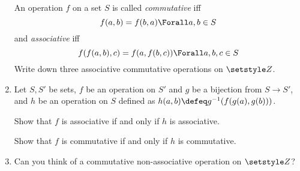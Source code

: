 \begin{enumerate}
  An operation \(f\) on a set \(S\) is called \emph{commutative} iff
  \begin{equation*}
   f(a, b) = f(b, a) \Forall a, b \in S
  \end{equation*}
  and \emph{associative} iff
  \begin{equation*}
   f(f(a, b), c) = f(a, f(b, c)) \Forall a, b, c \in S
  \end{equation*}
  Write down three associative commutative operations on \(\Integers\).

 \item \label{q_functions_op_biject}
  Let \(S, S'\) be sets, \(f\) be an operation on \(S'\) and
  \(g\) be a bijection from \(S \to S'\), and \(h\) be an operation on \(S\)
  defined as \(h(a, b) \defeq g^{-1}(f(g(a), g(b)))\).

  Show that \(f\) is associative if and only if \(h\) is associative.

  Show that \(f\) is commutative if and only if \(h\) is commutative.
 \item
  Can you think of a commutative non-associative operation on \(\Integers\)?


\end{enumerate}
